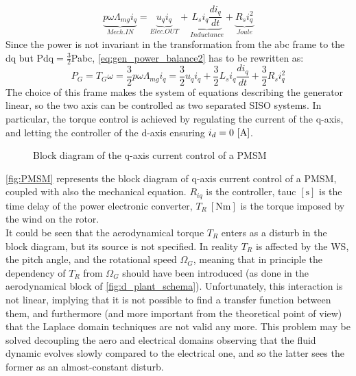 \begin{equation}
  \underbrace{p\omega\Lambda_{mg}i_q}_{Mech. IN} = \underbrace{u_qi_q}_{Elec. OUT}+ \underbrace{L_{s} i_q\frac{di_q}{dt}}_{Inductance} + \underbrace{R_{s}i_q^2}_{Joule}
  \label{eq:gen_power_balance2}
\end{equation}
Since the power is not invariant in the transformation from the abc frame to the dq but \acrshort{Pdq}$= \frac{3}{2}$\acrshort{Pabc}, \autoref{eq:gen_power_balance2} has to be rewritten as:
\begin{equation}
  P_G = T_G\omega = \frac{3}{2}p\omega\Lambda_{mg}i_q = \frac{3}{2}u_qi_q + \frac{3}{2}L_{s} i_q\frac{di_q}{dt} + \frac{3}{2}R_{s} i_q^2
  \label{eq:gen_power_balance3}
\end{equation}
The choice of this frame makes the system of equations describing the generator linear, so the two axis can be controlled as two separated \acrfull{SISO} systems. In particular, the torque control is achieved by regulating the current of the q-axis, and letting the controller of the d-axis ensuring $i_d=0 \, \left[\si{\ampere}\right]$.
\begin{figure}[htb]

\caption{Block diagram of the q-axis current control of a PMSM}
\label{fig:PMSM}
\end{figure}

\autoref{fig:PMSM} represents the block diagram of q-axis current control of a \acrshort{PMSM}, coupled with also the mechanical equation. $R_{iq}$ is the controller, \acrshort{tauc} $\left[\si{\second}\right]$ is the time delay of the power electronic converter, $T_R \ \left[\si{\newton\meter}\right]$ is the torque imposed by the wind on the rotor.\\
It could be seen that the aerodynamical torque $T_R$ enters as a disturb in the block diagram, but its source is not specified. In reality $T_R$ is affected by the \acrshort{WS}, the pitch angle, and the rotational speed $\Omega_G$, meaning that in principle the dependency of $T_R$ from $\Omega_G$ should have been introduced (as done in the aerodynamical block of \autoref{fig:d_plant_schema}). Unfortunately, this interaction is not linear, implying that it is not possible to find a transfer function between them, and furthermore (and more important from the theoretical point of view) that the Laplace domain techniques are not valid any more. This problem may be solved decoupling the aero and electrical domains observing that the fluid dynamic evolves slowly compared to the electrical one, and so the latter sees the former as an almost-constant disturb. 

